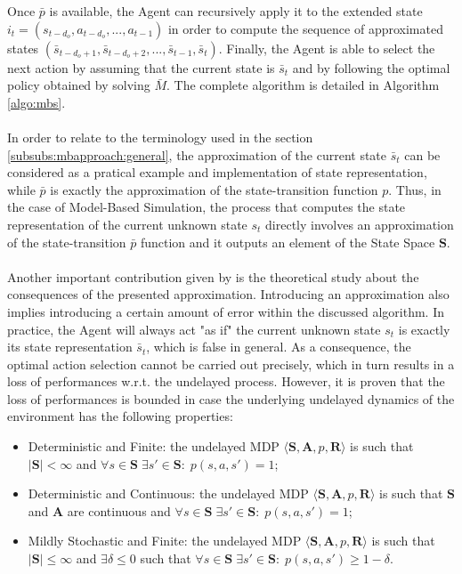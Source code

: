                 Once $\bar{p}$ is available, the Agent can recursively apply it to the extended state $i_t = \left( s_{t-d_{o}}, a_{t-d_{o}},..., a_{t-1}\right)$ in order to compute the sequence of approximated states $(\bar{s}_{t-d_{o}+1}, \bar{s}_{t-d_{o}+2}, ..., \bar{s}_{t-1}, \bar{s}_{t})$. Finally, the Agent is able to select the next action by assuming that the current state is $\bar{s}_{t}$ and by following the optimal policy obtained by solving $\bar{M}$. The complete algorithm is detailed in Algorithm \ref{algo:mbs}.
                \\\\
                In order to relate to the terminology used in the section \ref{subsubs:mbapproach:general}, the approximation of the current state $\bar{s}_t$ can be considered as a pratical example and implementation of state representation, while $\bar{p}$ is exactly the approximation of the state-transition function $p$. Thus, in the case of Model-Based Simulation, the process that computes the state representation of the current unknown state $s_t$ directly involves an approximation of the state-transition $\bar{p}$ function and it outputs an element of the State Space $\mathbf{S}$.
                \\\\
                Another important contribution given by  is the theoretical study about the consequences of the presented approximation. Introducing an approximation also implies introducing a certain amount of error within the discussed algorithm. In practice, the Agent will always act "as if" the current unknown state $s_t$ is exactly its state representation $\bar{s}_{t}$, which is false in general. As a consequence, the optimal action selection cannot be carried out precisely, which in turn results in a loss of performances w.r.t. the undelayed process. However, it is proven that the loss of performances is bounded in case the underlying undelayed dynamics of the environment has the following properties:
                
                \begin{itemize}
                    \item Deterministic and Finite: the undelayed MDP $\langle \mathbf{S}, \mathbf{A}, p, \mathbf{R}\rangle$ is such that $|\mathbf{S}| < \infty$ and $\forall s \in \mathbf{S} \; \exists s' \in \mathbf{S}: \; p(s,a,s') = 1$;
                    \item Deterministic and Continuous: the undelayed MDP $\langle \mathbf{S}, \mathbf{A}, p, \mathbf{R}\rangle$ is such that $\mathbf{S}$ and $\mathbf{A}$ are continuous and $\forall s \in \mathbf{S} \; \exists s' \in \mathbf{S}: \; p(s,a,s') = 1$;
                    \item Mildly Stochastic and Finite: the undelayed MDP $\langle \mathbf{S}, \mathbf{A}, p, \mathbf{R}\rangle$ is such that $|\mathbf{S}| \leq \infty$ and $\exists \delta \leq 0$ such that $\forall s \in \mathbf{S} \; \exists s' \in \mathbf{S}: \; p(s,a,s') \geq 1 - \delta$.
                \end{itemize}
                
